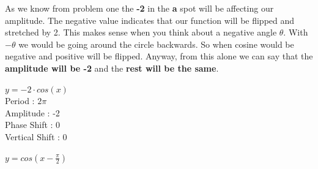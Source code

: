 \documentclass[10pt,letterpaper]{amspset}
\begin{document}
\begin{solution}[Solution]
    As we know from problem one the \textbf{-2} in the \textbf{a} spot will be affecting our amplitude. The negative value indicates that our function will be flipped and stretched by 2. This makes sense when you think about a negative angle $\theta$. With $-\theta$ we would be going around the circle backwards. So when cosine would be negative and positive will be flipped. Anyway, from this alone we can say that the \textbf{amplitude will be -2} and the \textbf{rest will be the same}.
    \medskip
   
    \noindent $y = -2 \cdot cos(x)$ \\[+2mm]
    Period : $2\pi$ \\[+2mm]
    Amplitude : -2 \\[+2mm]
    Phase Shift : 0 \\[+2mm]
    Vertical Shift : 0 \\
   
   
\end{solution}


\pagebreak


\begin{problem}[4]
    $y = cos(x - \frac{\pi}{2})$
\end{problem}
\end{document}
